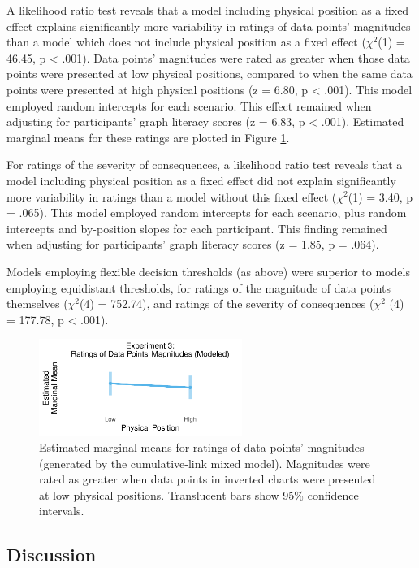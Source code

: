 \documentclass[journal]{vgtc}                %
\begin{document}
A likelihood ratio test
reveals that a model including physical position as a fixed effect
explains significantly more variability in ratings of data points' magnitudes than a model which
does not include physical position as a fixed effect
(\(\chi^2\)(1) = 46.45, p
\textless{} .001). Data points' magnitudes were
rated as greater when those data points were presented at low physical
positions, compared to when the same data points were presented at high
physical positions (z = 6.80, p
\textless{} .001). This model employed random intercepts for each
scenario. This effect remained when adjusting for participants' graph
literacy scores (z = 6.83, p
\textless{} .001). Estimated marginal means
for these ratings are plotted in Figure \ref{fig:r3-c-emm-plot}.

For ratings of the severity of consequences, a likelihood ratio test
reveals that a model including physical position as a fixed effect did
not explain significantly more variability in ratings than a model
without this fixed effect (\(\chi^2\)(1) =
3.40, p = .065). This
model employed random intercepts for each scenario, plus random
intercepts and by-position slopes for each participant. This finding
remained when adjusting for participants' graph literacy scores (z =
1.85, p
= .064).

Models employing flexible decision thresholds (as above) were superior
to models employing equidistant thresholds, for ratings of the magnitude
of data points themselves (\(\chi^2\)(4) =
752.74), and ratings of the severity of consequences
(\(\chi^2\) (4) = 177.78, p
\textless{} .001).

\begin{figure}
\includegraphics[width=250px]{position_magnitude_files/figure-latex/r3-c-emm-plot-1} \caption{Estimated marginal means for ratings of data points' magnitudes (generated by the cumulative-link mixed model). Magnitudes were rated as greater when data points in inverted charts were presented at low physical positions. Translucent bars show 95\% confidence intervals.}\label{fig:r3-c-emm-plot}
\end{figure}

\hypertarget{discussion-2}{%
\subsection{Discussion}\label{discussion-2}}
\end{document}
